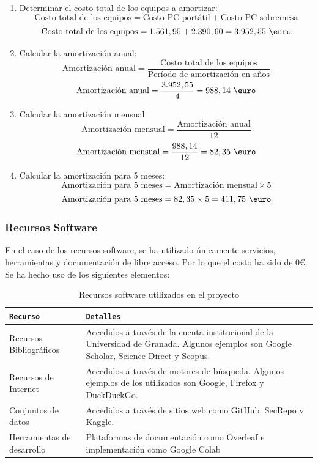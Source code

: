 \begin{enumerate}
    \item Determinar el costo total de los equipos a amortizar:
    \[
    \text{Costo total de los equipos} = \text{Costo PC portátil} + \text{Costo PC sobremesa}
    \]
    \[
    \text{Costo total de los equipos} = 1.561,95 + 2.390,60 = 3.952,55 \ \text{\euro}
    \]

    \item Calcular la amortización anual:
    \[
    \text{Amortización anual} = \frac{\text{Costo total de los equipos}}{\text{Período de amortización en años}}
    \]
    \[
    \text{Amortización anual} = \frac{3.952,55}{4} = 988,14 \ \text{\euro}
    \]

    \item Calcular la amortización mensual:
    \[
    \text{Amortización mensual} = \frac{\text{Amortización anual}}{12}
    \]
    \[
    \text{Amortización mensual} = \frac{988,14}{12} = 82,35 \ \text{\euro}
    \]

    \item Calcular la amortización para 5 meses:
    \[
    \text{Amortización para 5 meses} = \text{Amortización mensual} \times 5
    \]
    \[
    \text{Amortización para 5 meses} = 82,35 \times 5 = 411,75 \ \text{\euro}
    \]
\end{enumerate}

\subsubsection*{Recursos Software}

En el caso de los recursos software, se ha utilizado únicamente servicios, herramientas y documentación de libre acceso. Por lo que el costo ha sido de 0€. Se ha hecho uso de los siguientes elementos:

\begin{table}[H]
    \centering
    \footnotesize
    \begin{tabularx}{\linewidth}{|l|X|}
    \hline
    \rowcolor{graylight}\texttt{Recurso} & \texttt{Detalles} \\
    \hline
    Recursos Bibliográficos & Accedidos a través de la cuenta institucional de la Universidad de Granada. Algunos ejemplos son Google Scholar, Science Direct y Scopus. \vspace{2mm}\\
    \hline
    Recursos de Internet & Accedidos a través de motores de búsqueda. Algunos ejemplos de los utilizados son Google, Firefox y DuckDuckGo. \vspace{2mm}\\
    \hline
    Conjuntos de datos & Accedidos a través de sitios web como GitHub, SecRepo y Kaggle. \vspace{2mm}\\
    \hline
    Herramientas de desarrollo & Plataformas de documentación como Overleaf e implementación como Google Colab \vspace{2mm}\\
    \hline
    \end{tabularx}
    \caption{Recursos software utilizados en el proyecto}
    \label{tab:recursos}
\end{table}

